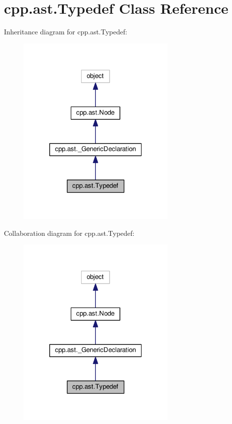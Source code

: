 \hypertarget{classcpp_1_1ast_1_1Typedef}{}\section{cpp.\+ast.\+Typedef Class Reference}
\label{classcpp_1_1ast_1_1Typedef}


Inheritance diagram for cpp.\+ast.\+Typedef\+:
\nopagebreak
\begin{figure}[H]
\begin{center}
\leavevmode
\includegraphics[width=220pt]{classcpp_1_1ast_1_1Typedef__inherit__graph}
\end{center}
\end{figure}


Collaboration diagram for cpp.\+ast.\+Typedef\+:
\nopagebreak
\begin{figure}[H]
\begin{center}
\leavevmode
\includegraphics[width=220pt]{classcpp_1_1ast_1_1Typedef__coll__graph}
\end{center}
\end{figure}
